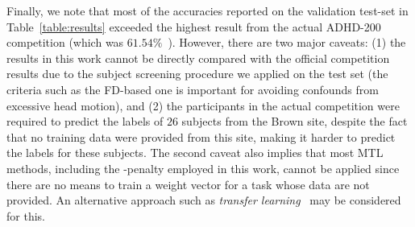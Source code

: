 \vspace{-.75pt}
Finally, we note that most of the accuracies reported on the validation test-set in Table~\ref{table:results} exceeded the highest result from the actual  ADHD-200 competition (which was $61.54\%$~\cite{ADHD200}).
However, there are two major caveats:
(1) the results in this work cannot be directly compared with the official competition results due to the subject screening procedure we applied on the test set (the criteria such as the FD-based one is important for avoiding  confounds from excessive head motion), and
(2) the participants in the actual competition were required to predict the labels of $26$ subjects from the Brown site, despite the fact that no training data were provided from this site, making it harder to predict the labels for these subjects.
The second caveat also implies that most MTL methods, including the \MTL-penalty employed in this work, cannot be applied since there are no means to train a weight vector for a task whose data are not provided.
An alternative approach such as \emph{transfer learning}~\cite{Pan:2010} may be considered for this.




